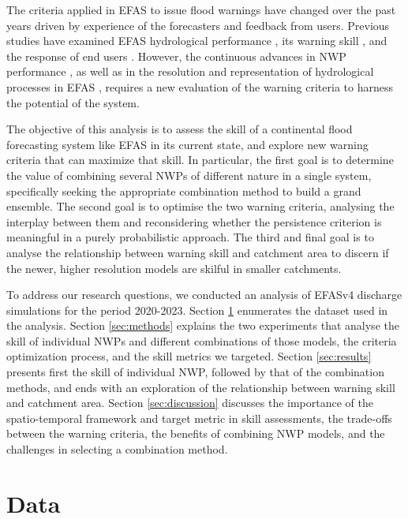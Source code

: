 \documentclass{ametsocV6.1}
\begin{document}
The criteria applied in EFAS to issue flood warnings have changed over the past years  driven by experience of the forecasters and feedback from users. Previous studies have examined EFAS hydrological performance \citep{Alfieri2014}, its warning skill \citep{Bartholmes2009, Thielen2009b}, and the response of end users \citep{Demeritt2013}. However, the continuous advances in NWP performance \citep{Bauer2015}, as well as in the resolution and representation of hydrological processes in EFAS \citep{EFASv4.0, EFASv5.0}, requires a new evaluation of the warning criteria to harness the potential of the system. 

The objective of this analysis is to assess the skill of a continental flood forecasting system like EFAS in its current state, and explore new warning criteria that can maximize that skill. In particular, the first goal is to determine the value of combining several NWPs of different nature in a single system, specifically seeking the appropriate combination method to build a grand ensemble. The second goal is to optimise the two warning criteria, analysing the interplay between them and reconsidering whether the persistence criterion is meaningful in a purely probabilistic approach. The third and final goal is to analyse the relationship between warning skill and catchment area to discern if the newer, higher resolution models are skilful in smaller catchments.

To address our research questions, we conducted an analysis of  EFASv4 discharge simulations for the period 2020-2023. Section \ref{sec:data} enumerates the dataset used in the analysis. Section \ref{sec:methods} explains the two experiments that analyse the skill of individual NWPs and  different combinations of those models, the criteria optimization process, and the skill metrics we targeted. Section \ref{sec:results} presents first the skill of individual NWP, followed by that of the combination methods, and ends with an exploration of the relationship between warning skill and catchment area. Section \ref{sec:discussion} discusses the importance of the spatio-temporal framework and target metric in skill assessments, the trade-offs between the warning criteria, the benefits of combining NWP models, and the challenges in selecting a combination method.

\section{Data}
\label{sec:data}
\end{document}
